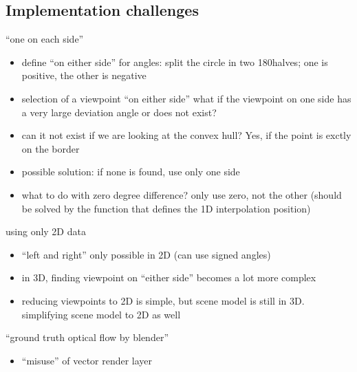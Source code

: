 \subsection{Implementation challenges}
``one on each side''
\begin{itemize}
  \item define ``on either side'' for angles: split the circle in two 180\degree halves; one is positive, the other is negative
  \item selection of a viewpoint ``on either side'' \ar what if the viewpoint on one side has a very large deviation angle or does not exist?
  \item can it not exist if we are looking at the convex hull? Yes, if the point is exctly on the border
  \item possible solution: if none is found, use only one side
  \item what to do with zero degree difference? \ar only use zero, not the other (should be solved by the function that defines the 1D interpolation position)
\end{itemize}
using only 2D data
\begin{itemize}
  \item ``left and right'' only possible in 2D (can use signed angles)
  \item in 3D, finding viewpoint on ``either side'' becomes a lot more complex
  \item reducing viewpoints to 2D is simple, but scene model is still in 3D. simplifying scene model to 2D as well
\end{itemize}
``ground truth optical flow by blender''
\begin{itemize}
  \item ``misuse'' of vector render layer
\end{itemize}

